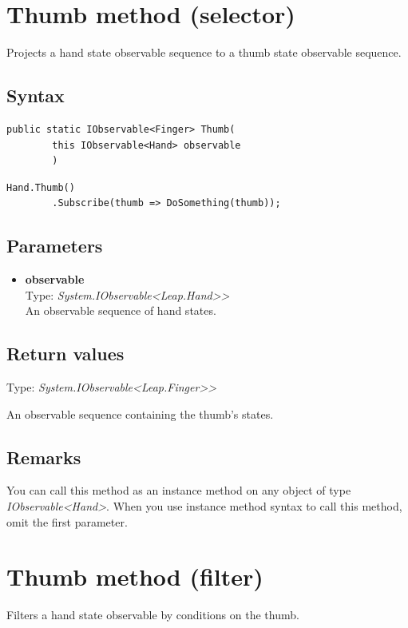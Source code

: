 \documentclass[12pt,a4paper,twoside]{report}
\begin{document}
\newpage

\section{Thumb method (selector)}
Projects a hand state observable sequence to a thumb state observable sequence.

\subsection{Syntax}

\begin{lstlisting}[caption=Declaration]
    public static IObservable<Finger> Thumb(
        this IObservable<Hand> observable
        )
\end{lstlisting}

\begin{lstlisting}[caption=Usage example]
    Hand.Thumb()
        .Subscribe(thumb => DoSomething(thumb));
\end{lstlisting}

\subsection{Parameters}
\begin{itemize}
    \item \textbf{observable}\\
        Type: \textit{System.IObservable<Leap.Hand>{}>}\\
        An observable sequence of hand states.
\end{itemize}

\subsection{Return values}
Type: \textit{System.IObservable<Leap.Finger>{}>}

An observable sequence containing the thumb's states.

\subsection{Remarks}
You can call this method as an instance method on any object of type \textit{IObservable<Hand>}. When you use 
instance method syntax to call this method, omit the first parameter.

\newpage

\section{Thumb method (filter)}
Filters a hand state observable by conditions on the thumb.
\end{document}
